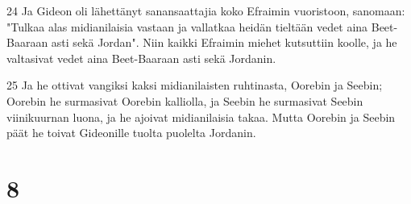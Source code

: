 \par 24 Ja Gideon oli lähettänyt sanansaattajia koko Efraimin vuoristoon, sanomaan: "Tulkaa alas midianilaisia vastaan ja vallatkaa heidän tieltään vedet aina Beet-Baaraan asti sekä Jordan". Niin kaikki Efraimin miehet kutsuttiin koolle, ja he valtasivat vedet aina Beet-Baaraan asti sekä Jordanin.
\par 25 Ja he ottivat vangiksi kaksi midianilaisten ruhtinasta, Oorebin ja Seebin; Oorebin he surmasivat Oorebin kalliolla, ja Seebin he surmasivat Seebin viinikuurnan luona, ja he ajoivat midianilaisia takaa. Mutta Oorebin ja Seebin päät he toivat Gideonille tuolta puolelta Jordanin.

\chapter{8}

